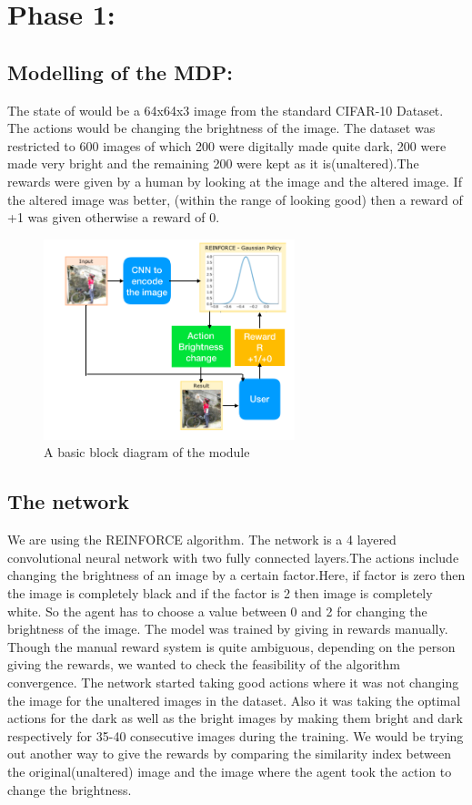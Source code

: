 \documentclass{article}
\begin{document}
\section{Phase 1:}

\subsection{Modelling of the MDP:}
 The state of would be a 64x64x3 image from the standard CIFAR-10 Dataset. The actions would be changing the brightness of the image. The dataset was restricted to 600 images of which 200 were digitally made quite dark, 200 were made very bright and the remaining 200 were kept as it is(unaltered).The rewards were given by a human by looking at the image and the altered image. If the altered image was better, (within the range of looking good) then a reward of +1 was given otherwise a reward of 0.
 \begin{figure}[H]
 \centering
 \includegraphics[width=0.65\textwidth]{module.png}
 \caption{A basic block diagram of the module}
\end{figure}
 
 \subsection{The network}
We are using the REINFORCE algorithm. The network is a 4 layered convolutional neural network with two fully connected layers.The actions include changing the brightness of an image by a certain factor.Here, if factor is zero then the image is completely black and if the factor is 2 then image is completely white. So the agent has to choose a value between 0 and 2 for changing the brightness of the image. The model was trained by giving in rewards manually. Though the manual reward system is quite ambiguous, depending on the person giving the rewards, we wanted to check the feasibility of the algorithm convergence. The network started taking good actions where it was not changing the image for the unaltered images in the dataset. Also it was taking the optimal actions for the dark as well as the bright images by making them bright and dark respectively for 35-40 consecutive images during the training. We would be trying out another way to give the rewards by comparing the similarity index between the original(unaltered) image and the image where the agent took the action to change the brightness.
\end{document}
